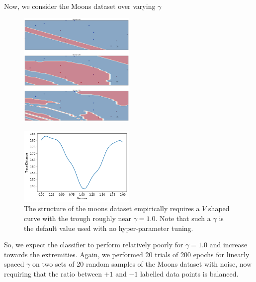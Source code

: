 \documentclass{beamer}
\newcommand\0{\mathbf{0}}
\newcommand\<{\langle}
\renewcommand\>{\rangle}
\begin{document}
\begin{frame}
Now, we consider the Moons dataset over varying $\gamma$

\begin{figure}[H]
\centering
\includegraphics[width=0.5\textwidth]{images/moons_gammas}	
\end{figure}

\end{frame}

\begin{frame}
\begin{figure}[H]
\centering
\includegraphics[width=0.5\textwidth]{images/moons_trace_distance}
\caption{The structure of the moons dataset empirically requires a $V$ shaped curve with the trough roughly near $\gamma = 1.0$. Note that such a $\gamma$ is the default value used with no hyper-parameter tuning.}
\end{figure}
\end{frame}

\begin{frame}
So, we expect the classifier to perform relatively poorly for $\gamma=1.0$ and increase towards the extremities. Again, we performed 20 trials of 200 epochs for linearly spaced $\gamma$ on two sets of 20 random samples of the Moons dataset with noise, now requiring that the ratio between $+1$ and $-1$ labelled data points is balanced.
\end{frame}
\end{document}
